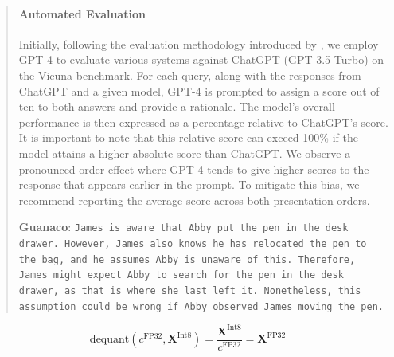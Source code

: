 \begin{quote}
\paragraph{Automated Evaluation} Initially, following the evaluation methodology introduced by \citet{vicuna2023}, we employ GPT-4 to evaluate various systems against ChatGPT (GPT-3.5 Turbo) on the Vicuna benchmark. For each query, along with the responses from ChatGPT and a given model, GPT-4 is prompted to assign a score out of ten to both answers and provide a rationale. The model’s overall performance is then expressed as a percentage relative to ChatGPT's score. It is important to note that this relative score can exceed 100\% if the model attains a higher absolute score than ChatGPT. We observe a pronounced order effect where GPT-4 tends to give higher scores to the response that appears earlier in the prompt. To mitigate this bias, we recommend reporting the average score across both presentation orders.

    \textbf{Guanaco}: \texttt{James is aware that Abby put the pen in the desk drawer. However, James also knows he has relocated the pen to the bag, and he assumes Abby is unaware of this. Therefore, James might expect Abby to search for the pen in the desk drawer, as that is where she last left it. Nonetheless, this assumption could be wrong if Abby observed James moving the pen.}
\end{quote}

\begin{equation}
    \text{dequant}(c^{\text{FP32}}, \mathbf{X}^{\text{Int8}}) = \frac{\mathbf{X}^{\text{Int8}}}{c^{\text{FP32}}} = \mathbf{X}^{\text{FP32}}
\end{equation}


